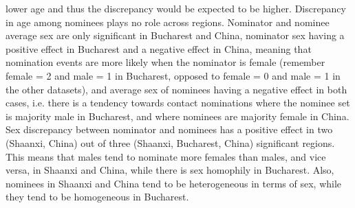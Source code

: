 lower age and thus the discrepancy would be expected to be higher. Discrepancy in age among nominees plays no role across regions. Nominator and nominee average sex are only significant in Bucharest and China, nominator sex having a positive effect in Bucharest and a negative effect in China, meaning that nomination events are more likely when the nominator is female (remember female = 2 and male = 1 in Bucharest, opposed to female = 0 and male = 1 in the other datasets), and average sex of nominees having a negative effect in both cases, i.e. there is a tendency towards contact nominations where the nominee set is majority male in Bucharest, and where nominees are majority female in China. Sex discrepancy between nominator and nominees has a positive effect in two (Shaanxi, China) out of three (Shaanxi, Bucharest, China) significant regions. This means that males tend to nominate more females than males, and vice versa, in Shaanxi and China, while there is sex homophily in Bucharest. Also, nominees in Shaanxi and China tend to be heterogeneous in terms of sex, while they tend to be homogeneous in Bucharest. 

